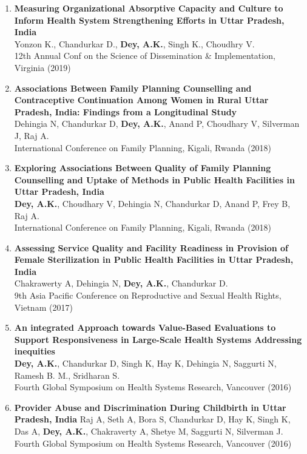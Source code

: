 \documentclass[13pt,letterpaper]{article}
\begin{document}
\begin{enumerate}
\item \textbf{Measuring Organizational Absorptive Capacity and Culture to Inform Health System Strengthening Efforts in Uttar Pradesh, India}\\
Yonzon K., Chandurkar D., \textbf{Dey, A.K.}, Singh K., Choudhry V.\\
12th Annual Conf on the Science of Dissemination \& Implementation, Virginia (2019) 

\item \textbf{Associations Between Family Planning Counselling and Contraceptive Continuation Among Women in Rural Uttar Pradesh, India: Findings from a Longitudinal Study}\\
Dehingia N, Chandurkar D, \textbf{Dey, A.K.}, Anand P, Choudhary V, Silverman J, Raj A.\\
International Conference on Family Planning, Kigali, Rwanda (2018)  

\item \textbf{Exploring Associations Between Quality of Family Planning Counselling and Uptake of Methods in Public Health Facilities in Uttar Pradesh, India}\\
\textbf{Dey, A.K.}, Choudhary V, Dehingia N, Chandurkar D, Anand P, Frey B, Raj A.\\
International Conference on Family Planning, Kigali, Rwanda (2018) 

\item \textbf{Assessing Service Quality and Facility Readiness in Provision of Female Sterilization in Public Health Facilities in Uttar Pradesh, India}\\
Chakrawerty A, Dehingia N, \textbf{Dey, A.K.}, Chandurkar D.\\
9th Asia Pacific Conference on Reproductive and Sexual Health Rights, Vietnam (2017) 

\item \textbf{An integrated Approach towards Value-Based Evaluations to Support Responsiveness in Large-Scale Health Systems Addressing inequities}\\
\textbf{Dey, A.K.}, Chandurkar D, Singh K, Hay K, Dehingia N, Saggurti N, Ramesh B. M., Sridharan S.\\
Fourth Global Symposium on Health Systems Research, Vancouver (2016) 

\item \textbf{Provider Abuse and Discrimination During Childbirth in Uttar Pradesh, India}
Raj A, Seth A, Bora S, Chandurkar D, Hay K, Singh K, Das A, \textbf{Dey, A.K.}, Chakraverty A, Shetye M, Saggurti N, Silverman J.
Fourth Global Symposium on Health Systems Research, Vancouver (2016) 
\end{enumerate}
\end{document}
